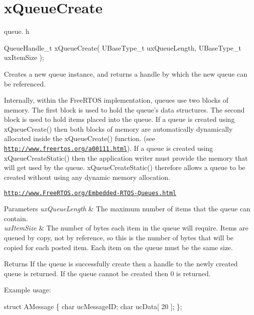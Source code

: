 \hypertarget{group__xQueueCreate}{\section{x\-Queue\-Create}
\label{group__xQueueCreate}
}
queue. h 
\begin{DoxyPre}
 QueueHandle\_t xQueueCreate(
                              UBaseType\_t uxQueueLength,
                              UBaseType\_t uxItemSize
                          );
   \end{DoxyPre}


Creates a new queue instance, and returns a handle by which the new queue can be referenced.

Internally, within the Free\-R\-T\-O\-S implementation, queues use two blocks of memory. The first block is used to hold the queue's data structures. The second block is used to hold items placed into the queue. If a queue is created using x\-Queue\-Create() then both blocks of memory are automatically dynamically allocated inside the x\-Queue\-Create() function. (see \href{http://www.freertos.org/a00111.html}{\tt http\-://www.\-freertos.\-org/a00111.\-html}). If a queue is created using x\-Queue\-Create\-Static() then the application writer must provide the memory that will get used by the queue. x\-Queue\-Create\-Static() therefore allows a queue to be created without using any dynamic memory allocation.

\href{http://www.FreeRTOS.org/Embedded-RTOS-Queues.html}{\tt http\-://www.\-Free\-R\-T\-O\-S.\-org/\-Embedded-\/\-R\-T\-O\-S-\/\-Queues.\-html}


\begin{DoxyParams}{Parameters}
{\em ux\-Queue\-Length} & The maximum number of items that the queue can contain.\\
\hline
{\em ux\-Item\-Size} & The number of bytes each item in the queue will require. Items are queued by copy, not by reference, so this is the number of bytes that will be copied for each posted item. Each item on the queue must be the same size.\\
\hline
\end{DoxyParams}
\begin{DoxyReturn}{Returns}
If the queue is successfully create then a handle to the newly created queue is returned. If the queue cannot be created then 0 is returned.
\end{DoxyReturn}
Example usage\-: 
\begin{DoxyPre}
 struct AMessage
 \{
    char ucMessageID;
    char ucData[ 20 ];
 \};\end{DoxyPre}



